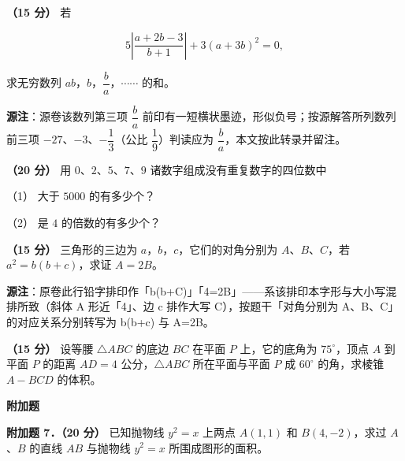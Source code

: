 \begin{question}
\textbf{（15 分）} 若

\nopagebreak[4]
\[
5\left|\frac{a+2b-3}{b+1}\right|+3(a+3b)^2=0,
\]

求无穷数列 $ab$，$b$，$\dfrac{b}{a}$，$\cdots\cdots$ 的和。

\begin{gktip}
\textbf{源注}：源卷该数列第三项 $\dfrac{b}{a}$ 前印有一短横状墨迹，形似负号；按源解答所列数列前三项 $-27$、$-3$、$-\dfrac13$（公比 $\dfrac19$）判读应为 $\dfrac{b}{a}$，本文按此转录并留注。
\end{gktip}

\end{question}
\begin{question}
\textbf{（20 分）} 用 $0$、$2$、$5$、$7$、$9$ 诸数字组成没有重复数字的四位数中

（1） 大于 $5000$ 的有多少个？

（2） 是 $4$ 的倍数的有多少个？

\end{question}
\begin{question}
\textbf{（15 分）} 三角形的三边为 $a$，$b$，$c$，它们的对角分别为 $A$、$B$、$C$，若 $a^2=b(b+c)$，求证 $A=2B$。

\begin{gktip}
\textbf{源注}：原卷此行铅字排印作「b(b+C)」「4=2B」——系该排印本字形与大小写混排所致（斜体 A 形近「4」、边 c 排作大写 C），按题干「对角分别为 A、B、C」的对应关系分别转写为 b(b+c) 与 A=2B。
\end{gktip}

\end{question}
\begin{question}
\textbf{（15 分）} 设等腰 $\triangle ABC$ 的底边 $BC$ 在平面 $P$ 上，它的底角为 $75^\circ$，顶点 $A$ 到平面 $P$ 的距离 $AD=4$ 公分，$\triangle ABC$ 所在平面与平面 $P$ 成 $60^\circ$ 的角，求棱锥 $A-BCD$ 的体积。

\begin{gktip}
\Needspace{0.25\textheight}
\textbf{附加题}
\end{gktip}

\textbf{附加题 7．（20 分）} 已知抛物线 $y^2=x$ 上两点 $A(1,1)$ 和 $B(4,-2)$，求过 $A$、$B$ 的直线 $AB$ 与抛物线 $y^2=x$ 所围成图形的面积。

\end{question}